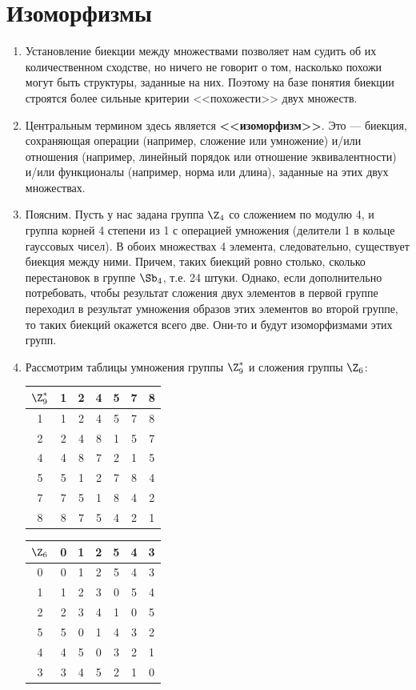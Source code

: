 \section{Изоморфизмы}


\begin{enumerate}
\item Установление биекции между множествами позволяет нам судить об их количественном сходстве, но ничего не говорит о том, насколько похожи могут быть структуры, заданные на них. Поэтому на базе понятия биекции строятся более сильные критерии <<похожести>> двух множеств.
\item Центральным термином здесь является \textbf{<<изоморфизм>>}. Это --- биекция, сохраняющая операции (например, сложение или умножение) и/или отношения (например, линейный порядок или отношение эквивалентности) и/или функционалы (например, норма или длина), заданные на этих двух множествах.
\item Поясним. Пусть у нас задана группа $\Z_4$ со сложением по модулю 4, и группа корней 4 степени из 1 с операцией умножения (делители 1 в кольце гауссовых чисел). В обоих множествах 4 элемента, следовательно, существует биекция между ними. Причем, таких биекций ровно столько, сколько перестановок в группе $\Sb_4$, т.е. 24 штуки. Однако, если дополнительно потребовать, чтобы результат сложения двух элементов в первой группе переходил в результат умножения образов этих элементов во второй группе, то таких биекций окажется всего две. Они-то и будут изоморфизмами этих групп.

\item Рассмотрим таблицы умножения группы $\Z_9^*$ и сложения группы $\Z_6$:

\begin{center}
\begin{tabular}{c|cccccc}
$\Z_9^*$ & 1 & 2 & \cellcolor{lightRed} 4 & 5 & 7 & 8\\  \hline
1 & 1 & 2 & 4 & 5 & 7 & 8\\
2 & 2 & 4 & 8 & 1 & 5 & 7\\
4 & 4 & 8 & 7 & 2 & 1 & 5\\
5 & 5 & 1 & 2 & 7 & 8 & 4\\
7 & 7 & 5 & 1 & 8 & \cellcolor{lightRed} 4 & 2\\
8 & 8 & 7 & 5 & 4 & 2 & 1
\end{tabular}
\qquad
\begin{tabular}{c|cccccc}
$\Z_6$ & 0 & 1 & \cellcolor{lightRed} 2 & 5 & 4 & 3\\  \hline
0 & 0 & 1 & 2 & 5 & 4 & 3\\
1 & 1 & 2 & 3 & 0 & 5 & 4\\
2 & 2 & 3 & 4 & 1 & 0 & 5\\
5 & 5 & 0 & 1 & 4 & 3 & 2\\
4 & 4 & 5 & 0 & 3 & \cellcolor{lightRed} 2 & 1\\
3 & 3 & 4 & 5 & 2 & 1 & 0
\end{tabular}
\end{center}


\end{enumerate}
